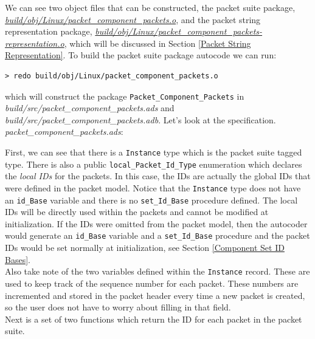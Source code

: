 We can see two object files that can be constructed, the packet suite package, \textit{\url{build/obj/Linux/packet\_component\_packets.o}}, and the packet string representation package, \textit{\url{build/obj/Linux/packet\_component\_packets-representation.o}}, which will be discussed in Section \ref{Packet String Representation}. To build the packet suite package autocode we can run:

\vspace{5mm} %
\begin{verbatim}
> redo build/obj/Linux/packet_component_packets.o
\end{verbatim}
\vspace{5mm} %

which will construct the package \texttt{Packet\_Component\_Packets} in \textit{build/src/packet\_component\_packets.ads} and \textit{build/src/packet\_component\_packets.adb}. Let's look at the specification. \\

\textit{packet\_component\_packets.ads}:

First, we can see that there is a \texttt{Instance} type which is the packet suite tagged type. There is also a public \texttt{local\_Packet\_Id\_Type} enumeration which declares the \textit{local IDs} for the packets. In this case, the IDs are actually the global IDs that were defined in the packet model. Notice that the \texttt{Instance} type does not have an \texttt{id\_Base} variable and there is no \texttt{set\_Id\_Base} procedure defined. The local IDs will be directly used within the packets and cannot be modified at initialization. If the IDs were omitted from the packet model, then the autocoder would generate an \texttt{id\_Base} variable and a \texttt{set\_Id\_Base} procedure and the packet IDs would be set normally at initialization, see Section \ref{Component Set ID Bases}. \\

Also take note of the two variables defined within the \texttt{Instance} record. These are used to keep track of the sequence number for each packet. These numbers are incremented and stored in the packet header every time a new packet is created, so the user does not have to worry about filling in that field. \\

Next is a set of two functions which return the ID for each packet in the packet suite. \\

